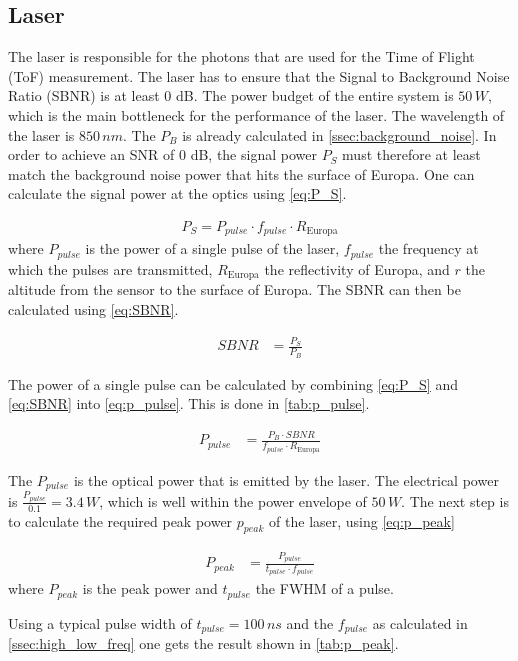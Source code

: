 \subsection{Laser}
The laser is responsible for the photons that are used for the Time of Flight (ToF) measurement. The laser has to ensure that the Signal to Background Noise Ratio (SBNR) is at least 0 dB. The power budget of the entire system is $50\,W$, which is the main bottleneck for the performance of the laser. The wavelength of the laser is $850\,nm$. The $P_B$ is already calculated in \cref{ssec:background_noise}. In order to achieve an SNR of 0 dB, the signal power $P_S$ must therefore at least match the background noise power that hits the surface of Europa. One can calculate the signal power at the optics using \cref{eq:P_S}.

\begin{align}\label{eq:P_S}
	P_S = P_{pulse} \cdot f_{pulse} \cdot R_{\text{Europa}}
\end{align}
where $P_{pulse}$ is the power of a single pulse of the laser, $f_{pulse}$ the frequency at which the pulses are transmitted, $R_{\text{Europa}}$ the reflectivity of Europa, and $r$ the altitude from the sensor to the surface of Europa. The SBNR can then be calculated using \cref{eq:SBNR}.

\begin{align}\label{eq:SBNR}
	SBNR &= \frac{P_S}{P_B}
\end{align}

The power of a single pulse can be calculated by combining \cref{eq:P_S} and \cref{eq:SBNR} into \cref{eq:p_pulse}. This is done in \cref{tab:p_pulse}.

\begin{align}
	P_{pulse} &= \frac{P_B\cdot SBNR}{f_{pulse}\cdot R_{\text{Europa}}}
\end{align}



The $P_{pulse}$ is the optical power that is emitted by the laser. The electrical power is $\frac{P_{pulse}}{0.1}=3.4\,W$, which is well within the power envelope of $50\,W$. The next step is to calculate the required peak power $p_{peak}$ of the laser, using \cref{eq:p_peak}

\begin{align}\label{eq:p_peak}
 	P_{peak} &= \frac{P_{pulse}}{t_{pulse} \cdot f_{pulse}}
 \end{align} 
where $P_{peak}$ is the peak power and $t_{pulse}$ the FWHM of a pulse.

Using a typical pulse width of $t_{pulse} = 100\,ns$ and the $f_{pulse}$ as calculated in \cref{ssec:high_low_freq} one gets the result shown in \cref{tab:p_peak}.



